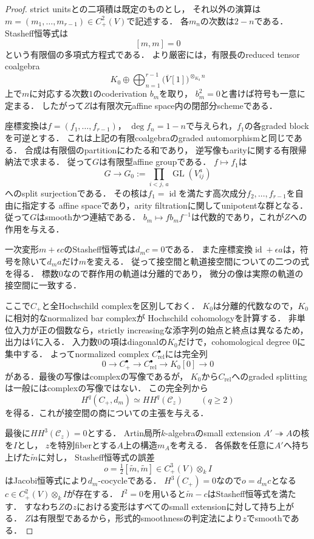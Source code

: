 \documentclass[11pt,a4paper]{ltjsarticle}
\theoremstyle{definition}
\newcommand{\id}{\operatorname{id}}
\begin{document}
\begin{proof}
strict unitsとの二項積は既定のものとし，
それ以外の演算は$m=(m_1,\ldots,m_{r-1})\in C_+^2(V)$で記述する．
各$m_n$の次数は$2-n$である．
Stasheff恒等式は
\[
 [m,m]=0
\]
という有限個の多項式方程式である．
より厳密には，有限長のreduced tensor coalgebra
\[
 K_0\oplus
 \bigoplus_{n=1}^{r-1}\bigl(\overline V[1]\bigr)^{\otimes_{K_0}n}
\]
上で$m$に対応する次数$1$のcoderivation $b_m$を取り，
$b_m^2=0$と書けば符号も一意に定まる．
したがって$Z$は有限次元affine space内の閉部分schemeである．

座標変換は$f=(f_1,\ldots,f_{r-1})$，
$\deg f_n=1-n$で与えられ，$f_1$の各graded blockを可逆とする．
これは上記の有限coalgebraのgraded automorphismと同じである．
合成は有限個のpartitionにわたる和であり，
逆写像もarityに関する有限帰納法で求まる．
従って$G$は有限型affine groupである．
$f\mapsto f_1$は
\[
 G\longrightarrow
 G_0:=\prod_{i<j,\,a}\operatorname{GL}(V_{ij}^a)
\]
へのsplit surjectionである．
その核は$f_1=\id$を満たす高次成分$f_2,\ldots,f_{r-1}$を自由に指定する
affine spaceであり，arity filtrationに関してunipotentな群となる．
従って$G$はsmoothかつ連結である．
$b_m\mapsto f b_m f^{-1}$は代数的であり，これが$Z$への作用を与える．

一次変形$m+\epsilon c$のStasheff恒等式は$d_mc=0$である．
また座標変換$\id+\epsilon a$は，符号を除いて$d_ma$だけ$m$を変える．
従って接空間と軌道接空間についての二つの式を得る．
標数$0$なので群作用の軌道は分離的であり，
微分の像は実際の軌道の接空間に一致する．

ここで$C_+$と全Hochschild complexを区別しておく．
$K_0$は分離的代数なので，$K_0$に相対的なnormalized bar complexが
Hochschild cohomologyを計算する．
非単位入力が正の個数なら，strictly increasingな添字列の始点と終点は異なるため，
出力は$\overline V$に入る．
入力数$0$の項はdiagonalの$K_0$だけで，cohomological degree $0$に集中する．
よってnormalized complex $C^\bullet_{\mathrm{rel}}$には完全列
\[
 0\longrightarrow C_+^\bullet
 \longrightarrow C^\bullet_{\mathrm{rel}}
 \longrightarrow K_0[0]\longrightarrow0
\]
がある．最後の写像はcomplexの写像であるが，
$K_0$から$C_{\mathrm{rel}}$へのgraded splittingは一般にはcomplexの写像ではない．
この完全列から
\[
 H^q(C_+,d_m)\simeq HH^q(\mathcal C_z)\qquad(q\geq2)
\]
を得る．これが接空間の商についての主張を与える．

最後に$HH^3(\mathcal C_z)=0$とする．
Artin局所$k$-algebraのsmall extension $A'\twoheadrightarrow A$の核を$I$とし，
$z$を特別fiberとする$A$上の構造$m_A$を考える．
各係数を任意に$A'$へ持ち上げた$\widetilde m$に対し，
Stasheff恒等式の誤差
\[
 o=\tfrac12[\widetilde m,\widetilde m]
       \in C_+^3(V)\otimes_k I
\]
はJacobi恒等式により$d_m$-cocycleである．
$H^3(C_+)=0$なので$o=d_mc$となる
$c\in C_+^2(V)\otimes_kI$が存在する．
$I^2=0$を用いると$\widetilde m-c$はStasheff恒等式を満たす．
すなわち$Z$の$z$における変形はすべてのsmall extensionに対して持ち上がる．
$Z$は有限型であるから，形式的smoothnessの判定法により$z$でsmoothである．
\end{proof}
\end{document}
